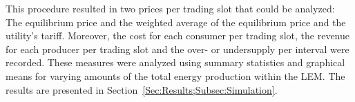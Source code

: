 This procedure resulted in two prices per trading slot that could be analyzed: The equilibrium price and the weighted average of the equilibrium price and the utility's tariff. Moreover, the cost for each consumer per trading slot, the revenue for each producer per trading slot and the over- or undersupply per interval were recorded. These measures were analyzed using summary statistics and graphical means for varying amounts of the total energy production within the LEM. The results are presented in Section~\ref{Sec:Results;Subsec:Simulation}.



